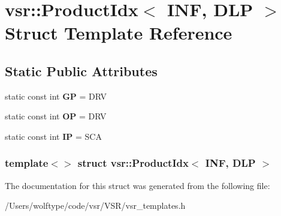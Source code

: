 \hypertarget{structvsr_1_1_product_idx_3_01_i_n_f_00_01_d_l_p_01_4}{\section{vsr\-:\-:Product\-Idx$<$ I\-N\-F, D\-L\-P $>$ Struct Template Reference}
\label{structvsr_1_1_product_idx_3_01_i_n_f_00_01_d_l_p_01_4}
}
\subsection*{Static Public Attributes}
\begin{DoxyCompactItemize}
\item 
\hypertarget{structvsr_1_1_product_idx_3_01_i_n_f_00_01_d_l_p_01_4_afc1f1e5a320f48d258f97174d94e2505}{static const int {\bfseries G\-P} = D\-R\-V}\label{structvsr_1_1_product_idx_3_01_i_n_f_00_01_d_l_p_01_4_afc1f1e5a320f48d258f97174d94e2505}

\item 
\hypertarget{structvsr_1_1_product_idx_3_01_i_n_f_00_01_d_l_p_01_4_a14c9da07d1f09f0b99adc8284c3691f9}{static const int {\bfseries O\-P} = D\-R\-V}\label{structvsr_1_1_product_idx_3_01_i_n_f_00_01_d_l_p_01_4_a14c9da07d1f09f0b99adc8284c3691f9}

\item 
\hypertarget{structvsr_1_1_product_idx_3_01_i_n_f_00_01_d_l_p_01_4_a9d4383493920cd4aabbcecbcc39ac9da}{static const int {\bfseries I\-P} = S\-C\-A}\label{structvsr_1_1_product_idx_3_01_i_n_f_00_01_d_l_p_01_4_a9d4383493920cd4aabbcecbcc39ac9da}

\end{DoxyCompactItemize}
\subsubsection*{template$<$$>$ struct vsr\-::\-Product\-Idx$<$ I\-N\-F, D\-L\-P $>$}



The documentation for this struct was generated from the following file\-:\begin{DoxyCompactItemize}
\item 
/\-Users/wolftype/code/vsr/\-V\-S\-R/vsr\-\_\-templates.\-h\end{DoxyCompactItemize}
